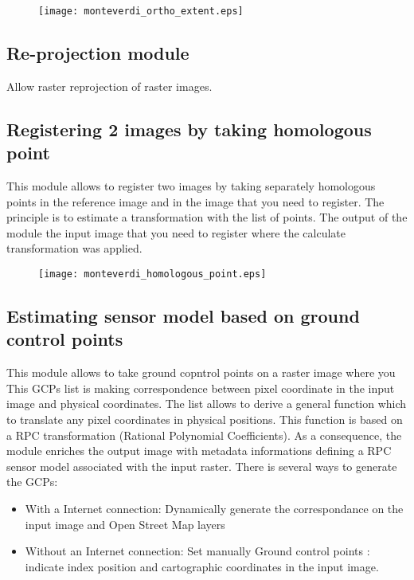 \documentclass{InsightSoftwareGuide}
\begin{document}
\begin{figure}
   \center
   \texttt{[image: monteverdi\_ortho\_extent.eps]}
   \label{fig:ortho}
\end{figure}

\subsection{Re-projection module}
Allow raster reprojection of raster images.
\subsection{Registering 2 images by taking homologous point}
This module allows to register two images by taking separately homologous points in the reference image and in the image 
that you need to register. The principle is to estimate a transformation with the list of points.
The output of the module the input image that you need to register where the calculate transformation was applied. 

\begin{figure}
   \center
   \texttt{[image: monteverdi\_homologous\_point.eps]}
   \label{fig:homologous}
\end{figure}


\subsection{Estimating sensor model based on ground control points}
This module allows to take ground copntrol points on a raster image where you 
This GCPs list is making correspondence between pixel coordinate in the input image and physical coordinates. The list
allows to derive a general function which to translate any pixel coordinates in physical positions. This function is 
based on a RPC transformation (Rational Polynomial Coefficients). As a consequence, the module enriches the output image 
with metadata informations defining a RPC sensor model associated with the input raster. 
There is several ways to generate the GCPs:

\begin{itemize}
\item With a Internet connection: Dynamically generate the correspondance on the input image and Open Street Map layers
\item Without an  Internet connection: Set manually Ground control points : indicate index position and cartographic 
coordinates in the input image.  
\end{itemize}
\end{document}
